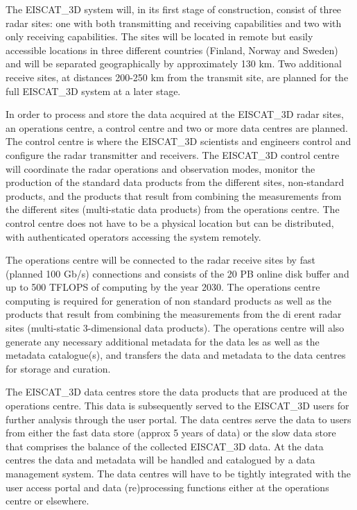 \documentclass[fleqn,11pt]{wlscirep}
\begin{document}
{The EISCAT\_3D system will, in its first stage of construction, consist of three radar sites: one with both transmitting and receiving  capabilities and two with only receiving capabilities. The sites will be located in remote but easily accessible locations in three different countries (Finland, Norway and Sweden) and will be separated geographically by approximately 130 km. Two additional receive sites, at distances 200-250 km from the transmit site, are planned for the full EISCAT\_3D system at a later stage. 

In order to process and store the data acquired at the EISCAT\_3D radar sites, an operations centre, a control centre and two or more data centres are planned. The control centre is where the EISCAT\_3D scientists and engineers control and configure the radar transmitter and receivers. The EISCAT\_3D control centre will coordinate the radar operations and observation modes, monitor the production of the standard data products from the different sites, non-standard products, and the products that result from combining the measurements from the different sites (multi-static data products) from the operations centre. The control centre does not have to be a physical location but can be distributed, with authenticated operators accessing the system remotely.

The operations centre will be connected to the radar receive sites by fast (planned 100 Gb/s)
connections and consists of the 20 PB online disk buffer and up to  500 TFLOPS of computing by the year 2030. The operations centre computing is required for generation of non standard products as well as the products that result from combining the measurements from the di
erent radar sites (multi-static 3-dimensional data products). The operations centre will also generate any necessary additional metadata for the data les as well as the metadata catalogue(s), and transfers the data and metadata to the data centres for storage and curation.

The EISCAT\_3D data centres store the data products that are produced at the operations centre. This data is subsequently served to the EISCAT\_3D users for further analysis through the user portal. The data centres serve the data to users from either the fast data store (approx 5 years of data) or the slow data store that comprises the balance of the collected EISCAT\_3D data. At the data centres the data and metadata will be handled and catalogued by a data management system. The data centres will have to be tightly integrated with the user access portal and data (re)processing functions either at the operations centre or elsewhere.

}
\end{document}
